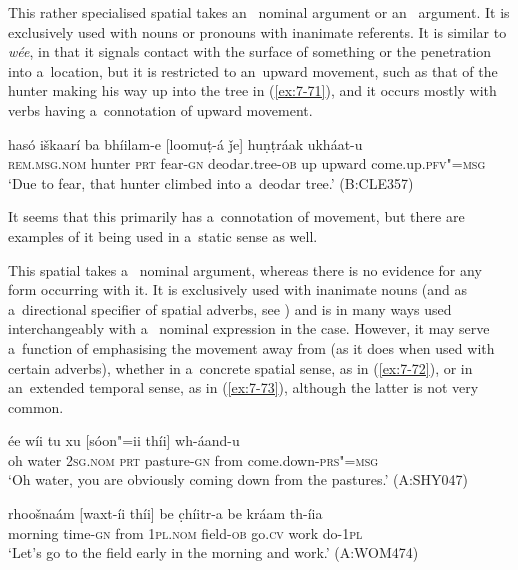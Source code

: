    This rather specialised spatial  takes an~ nominal argument or an~  argument. It is exclusively used with nouns or pronouns with inanimate referents. It is similar to \textit{wée}, in that it signals contact with the surface of something or the penetration into a~location, but it is restricted to an~upward movement, such as that of the hunter making his way up into the tree in (\ref{ex:7-71}), and it occurs mostly with verbs having a~connotation of upward movement. 

\begin{exe}
\ex
\label{ex:7-71}
\gll hasó iškaarí ba bhíilam-e [loomuṭ-á ǰe] huṇṭráak ukháat-u\\
\textsc{rem.msg.nom} hunter \textsc{prt} fear-\textsc{gn}  deodar.tree-\textsc{ob} up upward come.up.\textsc{pfv"=msg}\\
\glt `Due to fear, that hunter climbed into a~deodar tree.' (B:CLE357)
\end{exe}

It seems that this  primarily has a~connotation of movement, but there are examples of it being used in a~static sense as well.


 This spatial  takes a~ nominal argument, whereas there is no evidence for any  form occurring with it. It is exclusively used with inanimate nouns (and as a~directional specifier of spatial adverbs, see ) and is in many ways used interchangeably with a~ nominal expression in the  case. However, it may serve a~function of emphasising the movement away from (as it does when used with certain adverbs), whether in a~concrete spatial sense, as in (\ref{ex:7-72}), or in an~extended temporal sense, as in (\ref{ex:7-73}), although the latter is not very common.

\begin{exe}
\ex
\label{ex:7-72}
\gll ée wíi tu xu [sóon"=ii thíi] wh-áand-u \\
oh water \textsc{2sg.nom} \textsc{prt} pasture-\textsc{gn} from  come.down-\textsc{prs"=msg}  \\
\glt `Oh water, you are obviously coming down from the pastures.' (A:SHY047)
\end{exe}
\begin{exe}
\ex
\label{ex:7-73}
\gll rhoošnaám [waxt-íi thíi] be c̣híitr-a be kráam th-íia  \\
morning  time-\textsc{gn} from \textsc{1pl.nom} field-\textsc{ob} go.\textsc{cv} work do-\textsc{1pl} \\
\glt `Let's go to the field early in the morning and work.' (A:WOM474)
\end{exe}

